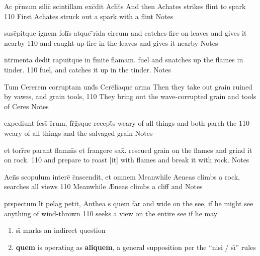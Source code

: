 \latline
  {Ac pr\={\macron {\i}}mum silic\={\macron {\i}} scintillam exc\={}dit Ach\={}t\={}s}
  { And then Achates strikes flint to spark }
  {110}
  { First Achates struck out a spark with a flint }
  { Notes }



\latline
  {susc\={}pitque ignem foli\={\macron {\i}}s atque \={}rida circum}
  { and catches fire on leaves and gives it nearby }
  {110}
  { and caught up fire in the leaves and gives it nearby }
  { Notes }


\latline
  {n\={}tr\={\macron {\i}}menta dedit rapuitque in f\={}mite flamam.}
  { fuel and snatches up the flames in tinder. }
  {110}
  { fuel, and catches it up in the tinder. }
  { Notes }


\latline
  {Tum Cererem corruptam und\={\macron {\i}}s Cere\={}liaque arma}
  { Then they take out grain ruined by vawes, and grain tools, }
  {110}
  { They bring out the wave-corrupted grain and tools of Ceres }
  { Notes }



\latline
  {expediunt fess\={\macron {\i}} r\={}rum, fr\={}g\={}sque recept\={}s}
  { weary of all things and both parch the  }
  {110}
  { weary of all things and the salvaged grain }
  { Notes }


\latline
  {et torr\={}re parant flamm\={\macron {\i}}s et frangere sax\={}.}
  { rescued grain on the flames and grind it on rock. }
  {110}
  { and prepare to roast [it] with flames and break it with rock. }
  { Notes }


\latline
  {Aen\={}\={}s scopulum intere\={} c\={}nscendit, et omnem}
  { Meanwhile Aeneas climbs a rock, searches all views }
  {110}
  { Meanwhile {\AE}neas climbs a cliff and  }
  { Notes }



\latline
  {pr\={}spectum l\={}t\={} pelag\={} petit, Anthea s\={\macron {\i}} quem}
  { far and wide on the see, if he might see anything of wind-thrown }
  {110}
  { seeks a view on the entire see if he may  }
  { \begin{enumerate}
  	\item s\={\i} marks an indirect question
  	\item \textbf{quem} is operating as \textbf{aliquem}, a general supposition per the ``nisi / s\={\i}'' rules
  \end{enumerate} }


